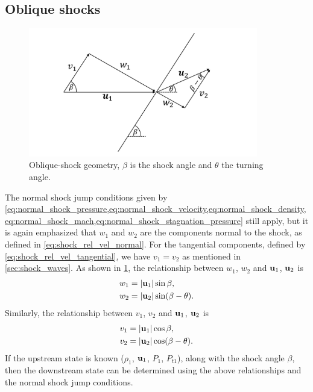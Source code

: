 \documentclass[oneside,a4paper,11pt]{report}
\begin{document}
\subsection{Oblique shocks}
\begin{figure}[ht]
\centering
\includegraphics[width=10cm]{../../images/oblique_shock.pdf}
\caption{Oblique-shock geometry, $\beta$ is the shock angle and $\theta$ the turning angle.}
\label{fig:oblique_shock}
\end{figure}
The normal shock jump conditions given by \cref{eq:normal_shock_pressure,eq:normal_shock_velocity,eq:normal_shock_density,eq:normal_shock_mach,eq:normal_shock_stagnation_pressure} still apply, but it is again emphasized that $w_1$ and $w_2$ are the components normal to the shock, as defined in \cref{eq:shock_rel_vel_normal}. For the tangential components, defined by \cref{eq:shock_rel_vel_tangential}, we have $v_1 = v_2$ as mentioned in \cref{sec:shock_waves}. As shown in \cref{fig:oblique_shock}, the relationship between $w_1$, $w_2$ and $\mathbf{u}_1$, $\mathbf{u}_2$ is
\begin{align}
w_1 &= |\mathbf{u}_1| \sin{ \beta }, \nonumber \\
w_2 &= |\mathbf{u}_2| \sin( \beta - \theta ).
\end{align}
Similarly, the relationship between $v_1$, $v_2$ and $\mathbf{u}_1$, $\mathbf{u}_2$ is
\begin{align}
v_1 &= |\mathbf{u}_1| \cos{ \beta }, \nonumber \\
v_2 &= |\mathbf{u}_2| \cos (\beta - \theta).
\end{align}
If the upstream state is known ($\rho_1$, $\mathbf{u}_1$, $P_1$, $P_{t1}$), along with the shock angle $\beta$, then the downstream state can be determined using the above relationships and the normal shock jump conditions.
\end{document}
